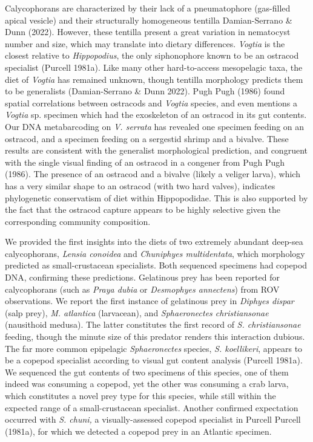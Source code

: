\documentclass[12pt,]{article}
\begin{document}
Calycophorans are characterized by their lack of a pneumatophore (gas-filled apical vesicle) and their structurally homogeneous tentilla Damian-Serrano \& Dunn (2022). However, these tentilla present a great variation in nematocyst number and size, which may translate into dietary differences. \emph{Vogtia} is the closest relative to \emph{Hippopodius}, the only siphonophore known to be an ostracod specialist (Purcell 1981a). Like many other hard-to-access mesopelagic taxa, the diet of \emph{Vogtia} has remained unknown, though tentilla morphology predicts them to be generalists (Damian-Serrano \& Dunn 2022). Pugh Pugh (1986) found spatial correlations between ostracods and \emph{Vogtia} species, and even mentions a \emph{Vogtia} sp. specimen which had the exoskeleton of an ostracod in its gut contents. Our DNA metabarcoding on \emph{V. serrata} has revealed one specimen feeding on an ostracod, and a specimen feeding on a sergestid shrimp and a bivalve. These results are consistent with the generalist morphological prediction, and congruent with the single visual finding of an ostracod in a congener from Pugh Pugh (1986). The presence of an ostracod and a bivalve (likely a veliger larva), which has a very similar shape to an ostracod (with two hard valves), indicates phylogenetic conservatism of diet within Hippopodidae. This is also supported by the fact that the ostracod capture appears to be highly selective given the corresponding community composition.

We provided the first insights into the diets of two extremely abundant deep-sea calycophorans, \emph{Lensia conoidea} and \emph{Chuniphyes multidentata}, which morphology predicted as small-crustacean specialists. Both sequenced specimens had copepod DNA, confirming these predictions. Gelatinous prey has been reported for calycophorans (such as \emph{Praya dubia} or \emph{Desmophyes annectens}) from ROV observations. We report the first instance of gelatinous prey in \emph{Diphyes dispar} (salp prey), \emph{M. atlantica} (larvacean), and \emph{Sphaeronectes christiansonae} (nausithoid medusa). The latter constitutes the first record of \emph{S. christiansonae} feeding, though the minute size of this predator renders this interaction dubious. The far more common epipelagic \emph{Sphaeronectes} species, \emph{S. koellikeri}, appears to be a copepod specialist according to visual gut content analysis (Purcell 1981a). We sequenced the gut contents of two specimens of this species, one of them indeed was consuming a copepod, yet the other was consuming a crab larva, which constitutes a novel prey type for this species, while still within the expected range of a small-crustacean specialist. Another confirmed expectation occurred with \emph{S. chuni,} a visually-assessed copepod specialist in Purcell Purcell (1981a), for which we detected a copepod prey in an Atlantic specimen.
\end{document}
